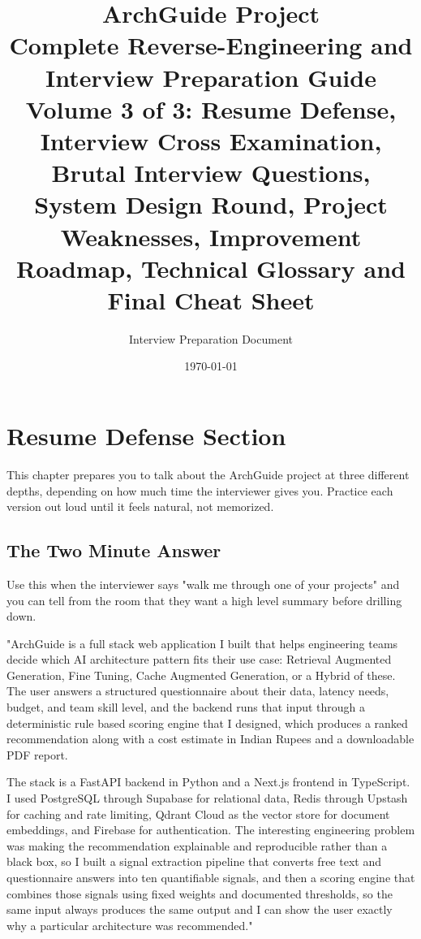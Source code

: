 \documentclass[11pt,a4paper]{report}
\title{
    \Huge \textbf{ArchGuide Project} \\[0.3cm]
    \Large Complete Reverse-Engineering and Interview Preparation Guide \\[0.5cm]
    \large Volume 3 of 3: Resume Defense, Interview Cross Examination, Brutal Interview Questions, System Design Round, Project Weaknesses, Improvement Roadmap, Technical Glossary and Final Cheat Sheet
}
\author{Interview Preparation Document}
\date{\today}
\begin{document}
\maketitle
\tableofcontents

\chapter{Resume Defense Section}

This chapter prepares you to talk about the ArchGuide project at three different depths, depending on how much time the interviewer gives you. Practice each version out loud until it feels natural, not memorized.

\section{The Two Minute Answer}

Use this when the interviewer says "walk me through one of your projects" and you can tell from the room that they want a high level summary before drilling down.

\begin{notebox}
"ArchGuide is a full stack web application I built that helps engineering teams decide which AI architecture pattern fits their use case: Retrieval Augmented Generation, Fine Tuning, Cache Augmented Generation, or a Hybrid of these. The user answers a structured questionnaire about their data, latency needs, budget, and team skill level, and the backend runs that input through a deterministic rule based scoring engine that I designed, which produces a ranked recommendation along with a cost estimate in Indian Rupees and a downloadable PDF report.

The stack is a FastAPI backend in Python and a Next.js frontend in TypeScript. I used PostgreSQL through Supabase for relational data, Redis through Upstash for caching and rate limiting, Qdrant Cloud as the vector store for document embeddings, and Firebase for authentication. The interesting engineering problem was making the recommendation explainable and reproducible rather than a black box, so I built a signal extraction pipeline that converts free text and questionnaire answers into ten quantifiable signals, and then a scoring engine that combines those signals using fixed weights and documented thresholds, so the same input always produces the same output and I can show the user exactly why a particular architecture was recommended."
\end{notebox}
\end{document}

